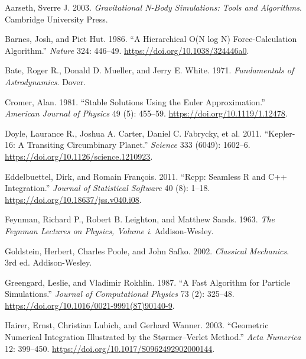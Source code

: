 \documentclass[
  10.5pt,
  letterpaper,
]{scrbook}
\newlength{\cslhangindent}
\newenvironment{CSLReferences}[2] %
 {\begin{list}{}{%
  \setlength{\itemindent}{0pt}
  \setlength{\leftmargin}{0pt}
  \setlength{\parsep}{0pt}
  \ifodd #1
   \setlength{\leftmargin}{\cslhangindent}
   \setlength{\itemindent}{-1\cslhangindent}
  \fi
  \setlength{\itemsep}{#2\baselineskip}}}
 {\end{list}}
\theoremstyle{definition}
\theoremstyle{plain}
\theoremstyle{remark}
\begin{document}

\protect{}\label{refs}
\begin{CSLReferences}{1}{1}
Aarseth, Sverre J. 2003. \emph{Gravitational {N}-Body Simulations: Tools
and Algorithms}. Cambridge University Press.

Barnes, Josh, and Piet Hut. 1986. {``A Hierarchical {O(N log N)}
Force-Calculation Algorithm.''} \emph{Nature} 324: 446--49.
\url{https://doi.org/10.1038/324446a0}.

Bate, Roger R., Donald D. Mueller, and Jerry E. White. 1971.
\emph{Fundamentals of Astrodynamics}. Dover.

Cromer, Alan. 1981. {``Stable Solutions Using the {Euler}
Approximation.''} \emph{American Journal of Physics} 49 (5): 455--59.
\url{https://doi.org/10.1119/1.12478}.

{Doyle, Laurance R., Joshua A. Carter, Daniel C. Fabrycky, et al.} 2011.
{``{Kepler-16}: A Transiting Circumbinary Planet.''} \emph{Science} 333
(6049): 1602--6. \url{https://doi.org/10.1126/science.1210923}.

Eddelbuettel, Dirk, and Romain François. 2011. {``{Rcpp}: Seamless {R}
and {C++} Integration.''} \emph{Journal of Statistical Software} 40 (8):
1--18. \url{https://doi.org/10.18637/jss.v040.i08}.

Feynman, Richard P., Robert B. Leighton, and Matthew Sands. 1963.
\emph{The Feynman Lectures on Physics, Volume i}. Addison-Wesley.

Goldstein, Herbert, Charles Poole, and John Safko. 2002. \emph{Classical
Mechanics}. 3rd ed. Addison-Wesley.

Greengard, Leslie, and Vladimir Rokhlin. 1987. {``A Fast Algorithm for
Particle Simulations.''} \emph{Journal of Computational Physics} 73 (2):
325--48. \url{https://doi.org/10.1016/0021-9991(87)90140-9}.

Hairer, Ernst, Christian Lubich, and Gerhard Wanner. 2003. {``Geometric
Numerical Integration Illustrated by the {St{ø}rmer--Verlet} Method.''}
\emph{Acta Numerica} 12: 399--450.
\url{https://doi.org/10.1017/S0962492902000144}.


\end{CSLReferences}
\end{document}
